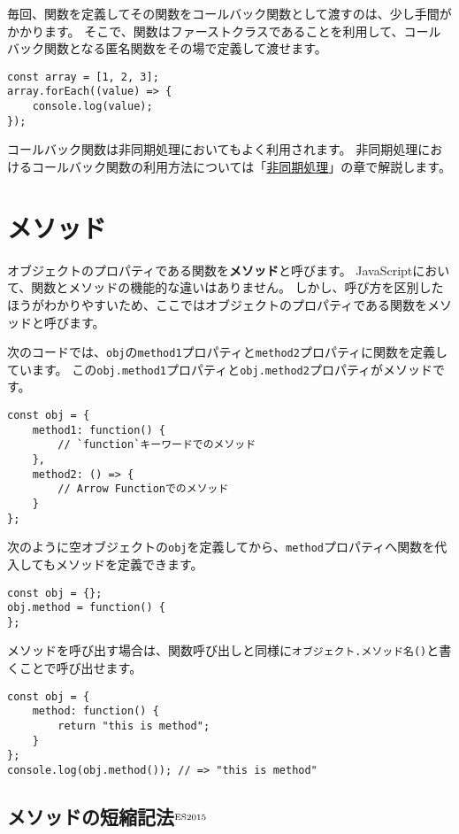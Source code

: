 毎回、関数を定義してその関数をコールバック関数として渡すのは、少し手間がかかります。
そこで、関数はファーストクラスであることを利用して、コールバック関数となる匿名関数をその場で定義して渡せます。

\begin{lstlisting}
const array = [1, 2, 3];
array.forEach((value) => {
    console.log(value);
});
\end{lstlisting}

コールバック関数は非同期処理においてもよく利用されます。
非同期処理におけるコールバック関数の利用方法については「\href{../async/README.md}{非同期処理}」の章で解説します。

\hypertarget{method}{%
\section{メソッド}\label{method}}

オブジェクトのプロパティである関数を\textbf{メソッド}と呼びます。
JavaScriptにおいて、関数とメソッドの機能的な違いはありません。
しかし、呼び方を区別したほうがわかりやすいため、ここではオブジェクトのプロパティである関数をメソッドと呼びます。

次のコードでは、\texttt{obj}の\texttt{method1}プロパティと\texttt{method2}プロパティに関数を定義しています。
この\texttt{obj.method1}プロパティと\texttt{obj.method2}プロパティがメソッドです。

\begin{lstlisting}
const obj = {
    method1: function() {
        // `function`キーワードでのメソッド
    },
    method2: () => {
        // Arrow Functionでのメソッド
    }
};
\end{lstlisting}

次のように空オブジェクトの\texttt{obj}を定義してから、\texttt{method}プロパティへ関数を代入してもメソッドを定義できます。

\begin{lstlisting}
const obj = {};
obj.method = function() {
};
\end{lstlisting}

メソッドを呼び出す場合は、関数呼び出しと同様に\texttt{オブジェクト.メソッド名()}と書くことで呼び出せます。

\begin{lstlisting}
const obj = {
    method: function() {
        return "this is method";
    }
};
console.log(obj.method()); // => "this is method"
\end{lstlisting}

\hypertarget{shorthand-for-method}{%
\subsection{メソッドの短縮記法{$^{\rm ES2015}$}}\label{shorthand-for-method}}

